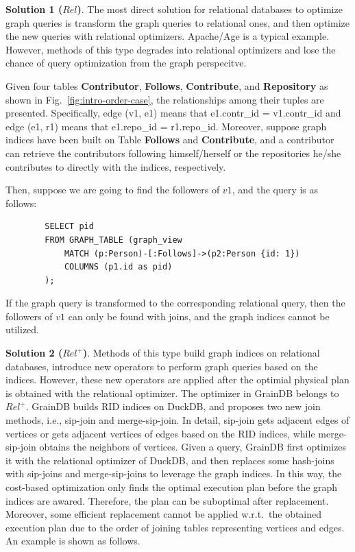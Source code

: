 \textbf{Solution 1 ($Rel$)}. 
The most direct solution for relational databases to optimize graph queries is transform the graph queries to relational ones, and then optimize the new queries with relational optimizers.
Apache/Age is a typical example.
However, methods of this type degrades into relational optimizers and lose the chance of query optimization from the graph perspecitve.

\begin{example}
    Given four tables \textbf{Contributor}, \textbf{Follows}, \textbf{Contribute}, and \textbf{Repository} as shown in Fig.~\ref{fig:intro-order-case}, the relationships among their tuples are presented.
    Specifically, edge (v1, e1) means that e1.contr\_id = v1.contr\_id and edge (e1, r1) means that e1.repo\_id = r1.repo\_id.
    Moreover, suppose graph indices have been built on Table \textbf{Follows} and \textbf{Contribute}, and a contributor can retrieve the contributors following himself/herself or the repositories he/she contributes to directly with the indices, respectively.

    Then, suppose we are going to find the followers of $v1$, and the query is as follows:
    \begin{lstlisting}
        SELECT pid
        FROM GRAPH_TABLE (graph_view
            MATCH (p:Person)-[:Follows]->(p2:Person {id: 1})
            COLUMNS (p1.id as pid)
        );
    \end{lstlisting}
    If the graph query is transformed to the corresponding relational query, then the followers of $v1$ can only be found with joins, and the graph indices cannot be utilized.
\end{example}


\textbf{Solution 2 ($Rel^+$)}.
Methods of this type build graph indices on relational databases, introduce new operators to perform graph queries based on the indices.
However, these new operators are applied after the optimial physical plan is obtained with the relational optimizer.
The optimizer in GrainDB belongs to $Rel^+$.
GrainDB builds RID indices on DuckDB, and proposes two new join methods, i.e., sip-join and merge-sip-join.
In detail, sip-join gets adjacent edges of vertices or gets adjacent vertices of edges based on the RID indices, while merge-sip-join obtains the neighbors of vertices.
Given a query, GrainDB first optimizes it with the relational optimizer of DuckDB, and then replaces some hash-joins with sip-joins and merge-sip-joins to leverage the graph indices.
In this way, the cost-based optimization only finds the optimal execution plan before the graph indices are awared.
Therefore, the plan can be suboptimal after replacement.
Moreover, some efficient replacement cannot be applied w.r.t.~the obtained execution plan due to the order of joining tables representing vertices and edges.
An example is shown as follows.

